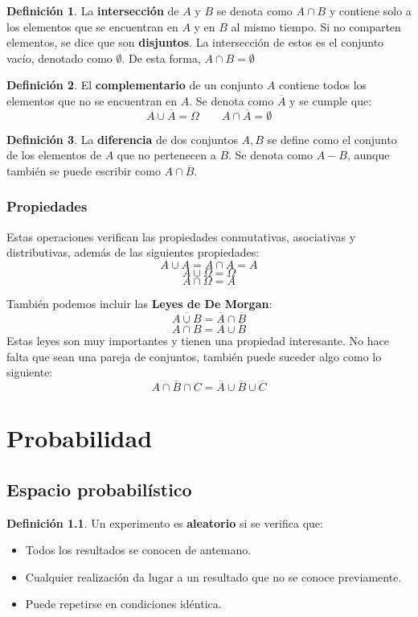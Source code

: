 \documentclass[a4paper]{book}
\numberwithin{figure}{section}
\numberwithin{equation}{subsection}
\numberwithin{figure}{chapter}
\theoremstyle{definition}
\newtheorem{definicion}{Definición}
\begin{document}
\begin{definicion}
	La \textbf{intersección} de $A$ y $B$ se denota como $A\cap B$ y contiene solo a los elementos que se encuentran en $A$ y en $B$ al mismo tiempo. Si no comparten elementos, se dice que son \textbf{disjuntos}. La intersección de estos es el conjunto vacío, denotado como $\emptyset$. De esta forma, $A\cap B = \emptyset$
\end{definicion}

\begin{definicion}
	El \textbf{complementario} de un conjunto $A$ contiene todos los elementos que no se encuentran en $A$. Se denota como $\overline{A}$ y se cumple que: \[A \cup \overline{A} = \Omega \qquad A \cap \overline{A} = \emptyset\]
\end{definicion}

\begin{definicion}
	La \textbf{diferencia} de dos conjuntos $A, B$ se define como el conjunto de los elementos de $A$ que no pertenecen a $B$. Se denota como $A-B$, aunque también se puede escribir como $A\cap \overline{B}$.
\end{definicion}

\subsection*{Propiedades}
Estas operaciones verifican las propiedades conmutativas, asociativas y distributivas, además de las siguientes propiedades:
\[A \cup A = A \cap A = A\]
\[A\cup \Omega = \Omega \]
\[A \cap \Omega = A\]

También podemos incluir las \textbf{Leyes de De Morgan}: \[\overline{A\cup B} = \overline{A} \cap \overline{B}\]
\[\overline{A\cap B} = \overline{A} \cup \overline{B}\]
Estas leyes son muy importantes y tienen una propiedad interesante. No hace falta que sean una pareja de conjuntos, también puede suceder algo como lo siguiente: \[\overline{A\cap B \cap C} = \overline{A} \cup \overline{B} \cup \overline{C}\]

\chapter{Probabilidad}


\section{Espacio probabilístico}
\begin{definicion}
	Un experimento es \textbf{aleatorio} si se verifica que: \begin{itemize}
		\item Todos los resultados se conocen de antemano.
		\item Cualquier realización da lugar a un resultado que no se conoce previamente.
		\item Puede repetirse en condiciones idéntica.
	\end{itemize}
\end{definicion}
\end{document}
